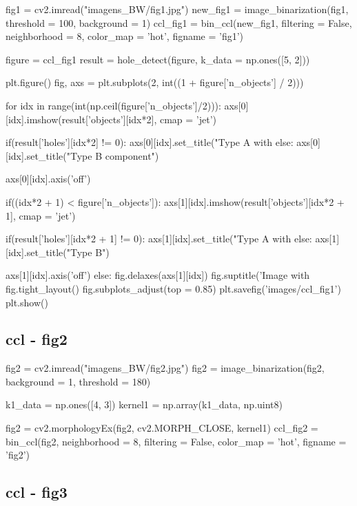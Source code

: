 \documentclass{article}
\begin{document}
\begin{python}
fig1 = cv2.imread("imagens_BW/fig1.jpg")
new_fig1 = image_binarization(fig1, threshold = 100, background = 1)
ccl_fig1 = bin_ccl(new_fig1, filtering = False, neighborhood = 8, color_map = 'hot', figname = 'fig1')

figure = ccl_fig1
result = hole_detect(figure, k_data = np.ones([5, 2]))

plt.figure()
fig, axs = plt.subplots(2, int((1 + figure['n_objects'] / 2)))

for idx in range(int(np.ceil(figure['n_objects']/2))):
	axs[0][idx].imshow(result['objects'][idx*2], cmap = 'jet')
	
	if(result['holes'][idx*2] != 0):
		axs[0][idx].set_title("Type A with %
	else:
		axs[0][idx].set_title("Type B component")
	
	axs[0][idx].axis('off')
	
	if((idx*2 + 1) < figure['n_objects']):
		axs[1][idx].imshow(result['objects'][idx*2 + 1], cmap = 'jet')
		
		if(result['holes'][idx*2 + 1] != 0):
			axs[1][idx].set_title("Type A with %
		else:
			axs[1][idx].set_title("Type B")        
		
		axs[1][idx].axis('off')
	else:
		fig.delaxes(axs[1][idx])
fig.suptitle('Image with %
fig.tight_layout()
fig.subplots_adjust(top = 0.85)
plt.savefig('images/ccl_fig1')
plt.show()	
\end{python}

\newpage
\subsection{ccl - fig2}
\label{cod:ccl_fig2}

\begin{python}
fig2 = cv2.imread("imagens_BW/fig2.jpg")
fig2 = image_binarization(fig2, background = 1, threshold = 180)

k1_data = np.ones([4, 3])
kernel1 = np.array(k1_data, np.uint8)

fig2 = cv2.morphologyEx(fig2, cv2.MORPH_CLOSE, kernel1)
ccl_fig2 = bin_ccl(fig2, neighborhood = 8, filtering = False, color_map = 'hot', figname = 'fig2')

\end{python}

\newpage
\subsection{ccl - fig3}
\label{cod:ccl_fig3}
\end{document}
